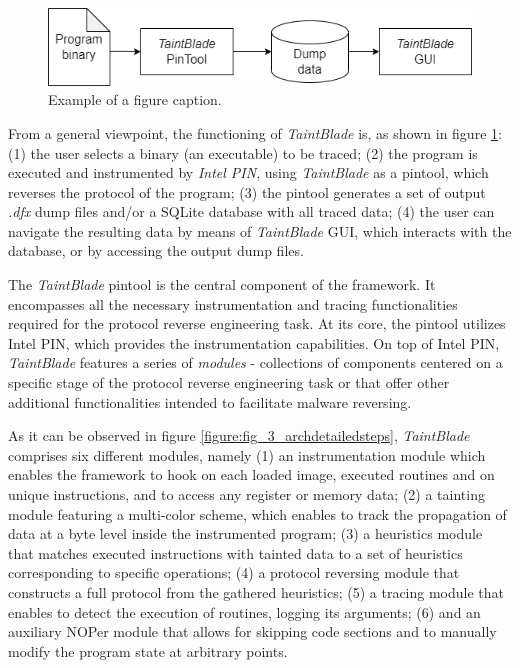 \documentclass[conference]{IEEEtran}
\begin{document}
\begin{figure}[htbp]
    \centerline{\includegraphics[width=0.9\columnwidth]{images/generalarch.drawio.png}}
    \caption{Example of a figure caption.}
    \label{fig_3_generalarch}
\end{figure}

From a general viewpoint, the functioning of \textit{TaintBlade} is, as shown
in figure \ref{fig_3_generalarch}: (1) the user selects a binary (an
executable) to be traced; (2) the program is executed and instrumented by
\textit{Intel PIN}, using \textit{TaintBlade} as a pintool, which reverses the
protocol of the program; (3) the pintool generates a set of output
\textit{.dfx} dump files and/or a SQLite database with all traced data; (4) the
user can navigate the resulting data by means of \textit{TaintBlade} GUI, which
interacts with the database, or by accessing the output dump files.

The \textit{TaintBlade} pintool is the central component of the framework. It
encompasses all the necessary instrumentation and tracing functionalities
required for the protocol reverse engineering task. At its core, the pintool
utilizes Intel PIN, which provides the instrumentation capabilities. On top of
Intel PIN, \textit{TaintBlade} features a series of \textit{modules} -
collections of components centered on a specific stage of the protocol reverse
engineering task or that offer other additional functionalities intended to
facilitate malware reversing.

As it can be observed in figure \ref{figure:fig_3_archdetailedsteps},
\textit{TaintBlade} comprises six different modules, namely (1) an
instrumentation module which enables the framework to hook on each loaded
image, executed routines and on unique instructions, and to access any register
or memory data; (2) a tainting module featuring a multi-color scheme, which
enables to track the propagation of data at a byte level inside the
instrumented program; (3) a heuristics module that matches executed
instructions with tainted data to a set of heuristics corresponding to specific
operations; (4) a protocol reversing module that constructs a full protocol
from the gathered heuristics; (5) a tracing module that enables to detect the
execution of routines, logging its arguments; (6) and an auxiliary NOPer module
that allows for skipping code sections and to manually modify the program state
at arbitrary points.
\end{document}
